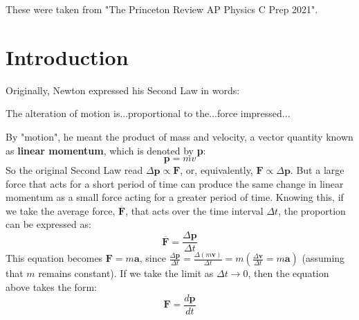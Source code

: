 \documentclass{article}
\begin{document}
\begin{note}
    These were taken from "The Princeton Review AP Physics C Prep 2021". 
\end{note}

\section{Introduction}
Originally, Newton expressed his Second Law in words:
\begin{displayquote}
    The alteration of motion is...proportional to the...force impressed...
\end{displayquote}
By "motion", he meant the product of mass and velocity, a vector quantity known as \textbf{linear momentum}, which is denoted by \textbf{p}:
\begin{equation*}
    \textbf{p}=mv
\end{equation*}
So the original Second Law read $\Delta \textbf{p} \propto \textbf{F}$, or, equivalently, $\textbf{F} \propto \Delta \textbf{p}$.
But a large force that acts for a short period of time can produce the same change in linear momentum as a small force acting for a greater period of time. 
Knowing this, if we take the average force, $\overline{\textbf{F}}$, that acts over the time interval $\Delta t$, the proportion can be expressed as:
\begin{equation*}
    \overline{\textbf{F}} = \frac{\Delta \textbf{p}}{\Delta t}
\end{equation*}
This equation becomes $\textbf{F} = m\textbf{a}$, since $\frac{\Delta \textbf{p}}{\Delta t}=\frac{\Delta(m\textbf{v})}{\Delta t} = m(\frac{\Delta \textbf{v}}{\Delta t} = m\textbf{a})$ (assuming that $m$ remains constant). If we take the limit as $\Delta t \rightarrow 0$, then the equation above takes the form:
\begin{equation*}
    \textbf{F} = \frac{d\textbf{p}}{dt}
\end{equation*}
\end{document}
